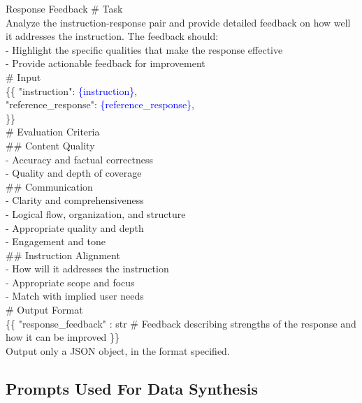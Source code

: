 \begin{promptbox}{Response Feedback}
\# Task \\
Analyze the instruction-response pair and provide detailed feedback on how well it addresses the instruction. The feedback should: \\
- Highlight the specific qualities that make the response effective \\
- Provide actionable feedback for improvement \\

\# Input \\
\{\{
  "instruction": \textcolor{blue}{\{instruction\}}, \\
  "reference\_response": \textcolor{blue}{\{reference\_response\}}, \\
\}\} \\

\# Evaluation Criteria \\
\#\# Content Quality \\
- Accuracy and factual correctness \\
- Quality and depth of coverage \\

\#\# Communication \\
- Clarity and comprehensiveness \\
- Logical flow, organization, and structure \\
- Appropriate quality and depth \\
- Engagement and tone \\

\#\# Instruction Alignment \\
- How will it addresses the instruction \\
- Appropriate scope and focus \\
- Match with implied user needs \\

\# Output Format \\
\{\{
  "response\_feedback" : str \# Feedback describing strengths of the response and how it can be improved
\}\} \\

Output only a JSON object, in the format specified.\end{promptbox}

\subsection{Prompts Used For Data Synthesis}

